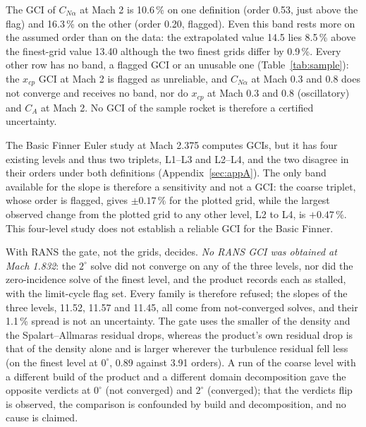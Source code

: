 \documentclass[twocolumn]{labreport}
\newcommand{\CNa}{C_{N\alpha}}
\begin{document}
The GCI of $\CNa$ at Mach 2 is 10.6\,\% on one definition (order 0.53, just above the flag) and 16.3\,\% on the other (order 0.20, flagged).
Even this band rests more on the assumed order than on the data: the extrapolated value 14.5 lies 8.5\,\% above the finest-grid value 13.40 although the two finest grids differ by 0.9\,\%.
Every other row has no band, a flagged GCI or an unusable one (Table~\ref{tab:sample}): the $x_{cp}$ GCI at Mach 2 is flagged as unreliable, and $\CNa$ at Mach 0.3 and 0.8 does not converge and receives no band, nor do $x_{cp}$ at Mach 0.3 and 0.8 (oscillatory) and $C_A$ at Mach 2.
No GCI of the sample rocket is therefore a certified uncertainty.

The Basic Finner Euler study at Mach 2.375 computes GCIs, but it has four existing levels and thus two triplets, L1--L3 and L2--L4, and the two disagree in their orders under both definitions (Appendix~\ref{sec:appA}).
The only band available for the slope is therefore a sensitivity and not a GCI: the coarse triplet, whose order is flagged, gives $\pm0.17\,\%$ for the plotted grid, while the largest observed change from the plotted grid to any other level, L2 to L4, is $+0.47\,\%$.
This four-level study does not establish a reliable GCI for the Basic Finner.

With RANS the gate, not the grids, decides.
\emph{No RANS GCI was obtained at Mach 1.832}: the $2^\circ$ solve did not converge on any of the three levels, nor did the zero-incidence solve of the finest level, and the product records each as stalled, with the limit-cycle flag set.
Every family is therefore refused; the slopes of the three levels, 11.52, 11.57 and 11.45, all come from not-converged solves, and their 1.1\,\% spread is not an uncertainty.
The gate uses the smaller of the density and the Spalart--Allmaras residual drops, whereas the product's own residual drop is that of the density alone and is larger wherever the turbulence residual fell less (on the finest level at $0^\circ$, 0.89 against 3.91 orders).
A run of the coarse level with a different build of the product and a different domain decomposition gave the opposite verdicts at $0^\circ$ (not converged) and $2^\circ$ (converged); that the verdicts flip is observed, the comparison is confounded by build and decomposition, and no cause is claimed.
\end{document}
